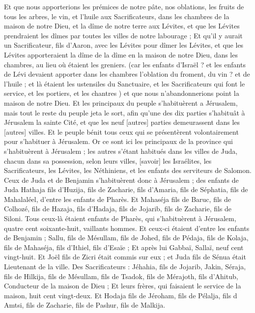 \begin{multicols}{2}
Et que nous apporterions les prémices de notre pâte, nos oblations, les fruits de tous les arbres, le vin, et l'huile aux Sacrificateurs, dans les chambres de la maison de notre Dieu, et la dîme de notre terre aux Lévites, et que les Lévites prendraient les dîmes par toutes les villes de notre labourage ;
Et qu'il y aurait un Sacrificateur, fils d'Aaron, avec les Lévites pour dîmer les Lévites, et que les Lévites apporteraient la dîme de la dîme en la maison de notre Dieu, dans les chambres, au lieu où étaient les greniers.
(car les enfants d'Israël ? et les enfants de Lévi devaient apporter dans les chambres l'oblation du froment, du vin ? et de l'huile ; et là étaient les ustensiles du Sanctuaire, et les Sacrificateurs qui font le service, et les portiers, et les chantres ) et que nous n'abandonnerions point la maison de notre Dieu.
\VerseOne{}Et les principaux du peuple s'habituèrent a Jérusalem, mais tout le reste du peuple jeta le sort, afin qu'une des dix parties s'habituât à Jérusalem la sainte Cité, et que les neuf [autres] parties demeurassent dans les [autres] villes.
Et le peuple bénit tous ceux qui se présentèrent volontairement pour s'habituer à Jérusalem.
Or ce sont ici les principaux de la province qui s'habituèrent à Jérusalem ; les autres s'étant habitués dans les villes de Juda, chacun dans sa possession, selon leurs villes, [savoir] les Israélites, les Sacrificateurs, les Lévites, les Néthiniens, et les enfants des serviteurs de Salomon.
Ceux de Juda et de Benjamin s'habituèrent donc à Jérusalem ; des enfants de Juda Hathaja fils d'Huzija, fils de Zacharie, fils d'Amaria, fils de Séphatia, fils de Mahalaléel, d'entre les enfants de Pharès.
Et Mahaséja fils de Baruc, fils de Colhozé, fils de Hazaja, fils d'Hadaja, fils de Jojarib, fils de Zacharie, fils de Siloni.
Tous ceux-là étaient enfants de Pharès, qui s'habituèrent à Jérusalem, quatre cent soixante-huit, vaillants hommes.
Et ceux-ci étaient d'entre les enfants de Benjamin ; Sallu, fils de Mésullam, fils de Johed, fils de Pédaja, fils de Kolaja, fils de Mahaséja, fils d'Ithiel, fils d'Esaïe ;
Et après lui Gabbaï, Sallaï, neuf cent vingt-huit.
Et Joël fils de Zicri était commis sur eux ; et Juda fils de Sénua était Lieutenant de la ville.
Des Sacrificateurs : Jéhahia, fils de Jojarib, Jakin,
Séraja, fils de Hilkija, fils de Mésullam, fils de Tsadok, fils de Mérajoth, fils d'Ahitub, Conducteur de la maison de Dieu ;
Et leurs frères, qui faisaient le service de la maison, huit cent vingt-deux. Et Hodaja fils de Jéroham, fils de Pélalja, fils d Amtsi, fils de Zacharie, fils de Pashur, fils de Malkija.

\end{multicols}

